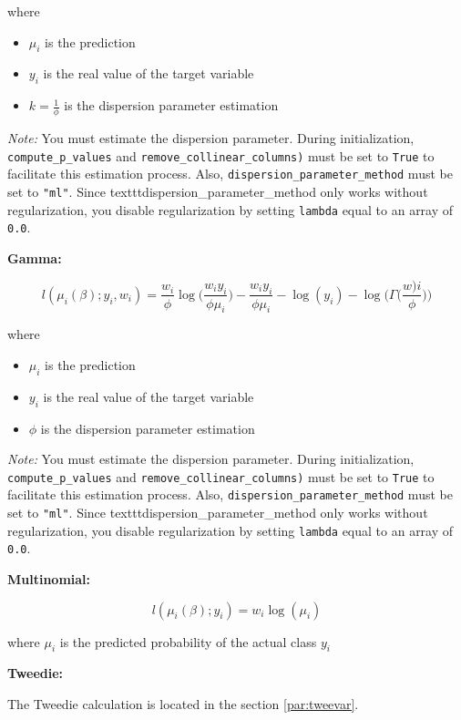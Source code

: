 where

\begin{itemize}
\item $\mu_i$ is the prediction
\item $y_i$ is the real value of the target variable
\item $k = \frac{1}{\phi}$ is the dispersion parameter estimation
\end{itemize}

\emph{Note:} You must estimate the dispersion parameter. During initialization, \texttt{compute\_p\_values} and \texttt{remove\_collinear\_columns)} must be set to \texttt{True} to facilitate this estimation process. Also, \texttt{dispersion\_parameter\_method} must be set to \texttt{"ml"}. Since texttt{dispersion\_parameter\_method} only works without regularization, you disable regularization by setting \texttt{lambda} equal to an array of \texttt{0.0}.

\textbf{Gamma:}

$$l(\mu_i (\beta); y_i, w_i) = \frac{w_i}{\phi} \log \big( \frac{w_i y_i}{\phi \mu_i} \big) - \frac{w_i y_i}{\phi \mu_i} - \log (y_i) - \log \big(\Gamma \big(\frac{w)i}{\phi} \big) \big)$$

where

\begin{itemize}
\item $\mu_i$ is the prediction
\item $y_i$ is the real value of the target variable
\item $\phi$ is the dispersion parameter estimation
\end{itemize}

\emph{Note:} You must estimate the dispersion parameter. During initialization, \texttt{compute\_p\_values} and \texttt{remove\_collinear\_columns)} must be set to \texttt{True} to facilitate this estimation process. Also, \texttt{dispersion\_parameter\_method} must be set to \texttt{"ml"}. Since texttt{dispersion\_parameter\_method} only works without regularization, you disable regularization by setting \texttt{lambda} equal to an array of \texttt{0.0}.

\textbf{Multinomial:}

$$l(\mu_i(\beta); y_i) = w_i \log (\mu_i)$$

where $\mu_i$ is the predicted probability of the actual class $y_i$

\textbf{Tweedie:}

The Tweedie calculation is located in the section \ref{par:tweevar}.

